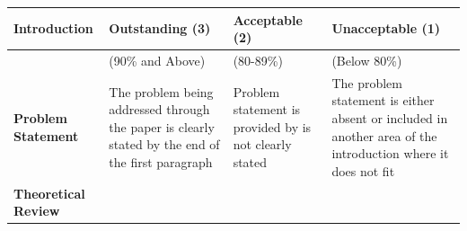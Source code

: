 \documentclass[
  openany]{book}
\begin{document}
\begin{longtable}[]{@{}llll@{}}
\toprule
\begin{minipage}[b]{0.22\columnwidth}\raggedright
Introduction\strut
\end{minipage} & \begin{minipage}[b]{0.22\columnwidth}\raggedright
Outstanding (3)\strut
\end{minipage} & \begin{minipage}[b]{0.22\columnwidth}\raggedright
Acceptable (2)\strut
\end{minipage} & \begin{minipage}[b]{0.22\columnwidth}\raggedright
Unacceptable (1)\strut
\end{minipage}\tabularnewline
\midrule
\endhead
\begin{minipage}[t]{0.22\columnwidth}\raggedright
\strut
\end{minipage} & \begin{minipage}[t]{0.22\columnwidth}\raggedright
(90\% and Above)\strut
\end{minipage} & \begin{minipage}[t]{0.22\columnwidth}\raggedright
(80-89\%)\strut
\end{minipage} & \begin{minipage}[t]{0.22\columnwidth}\raggedright
(Below 80\%)\strut
\end{minipage}\tabularnewline
\begin{minipage}[t]{0.22\columnwidth}\raggedright
\textbf{Problem Statement}\strut
\end{minipage} & \begin{minipage}[t]{0.22\columnwidth}\raggedright
The problem being addressed through the paper is clearly stated by the end of the first paragraph\strut
\end{minipage} & \begin{minipage}[t]{0.22\columnwidth}\raggedright
Problem statement is provided by is not clearly stated\strut
\end{minipage} & \begin{minipage}[t]{0.22\columnwidth}\raggedright
The problem statement is either absent or included in another area of the introduction where it does not fit\strut
\end{minipage}\tabularnewline
\begin{minipage}[t]{0.22\columnwidth}\raggedright
\textbf{Theoretical Review}\strut
\end{minipage} & \begin{minipage}[t]{0.22\columnwidth}\raggedright

\end{minipage}
\end{longtable}
\end{document}
